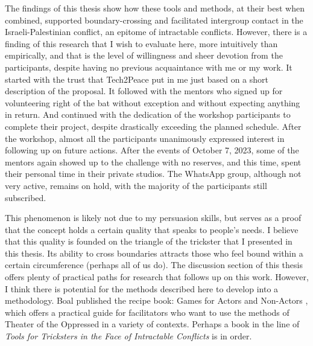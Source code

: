\documentclass[dissertation,math,vertlayout,pdfa,colorlinks]{aaltoseries}
\begin{document}
The findings of this thesis show how these tools and methods, at their best when combined, supported boundary-crossing and facilitated intergroup contact in the Israeli-Palestinian conflict, an epitome of intractable conflicts. However, there is a finding of this research that I wish to evaluate here, more intuitively than empirically, and that is the level of willingness and sheer devotion from the participants, despite having no previous acquaintance with me or my work. It started with the trust that Tech2Peace put in me just based on a short description of the proposal. It followed with the mentors who signed up for volunteering right of the bat without exception and without expecting anything in return. And continued with the dedication of the workshop participants to complete their project, despite drastically exceeding the planned schedule. After the workshop, almost all the participants unanimously expressed interest in following up on future actions. After the events of October 7, 2023, some of the mentors again showed up to the challenge with no reserves, and this time, spent their personal time in their private studios. The WhatsApp group, although not very active, remains on hold, with the majority of the participants still subscribed.

This phenomenon is likely not due to my persuasion skills, but serves as a proof that the concept holds a certain quality that speaks to people's needs. I believe that this quality is founded on the triangle of the trickster that I presented in this thesis. Its ability to cross boundaries attracts those who feel bound within a certain circumference (perhaps all of us do). The discussion section of this thesis offers plenty of practical paths for research that follows up on this work. However, I think there is potential for the methods described here to develop into a methodology. Boal published the recipe book: Games for Actors and Non-Actors \cite{boalGamesActorsNonActors2021}, which offers a practical guide for facilitators who want to use the methods of Theater of the Oppressed in a variety of contexts. Perhaps a book in the line of \textit{Tools for Tricksters in the Face of Intractable Conflicts} is in order.

\renewcommand{\bibname}{References}
\LARGE  %


\end{document}
